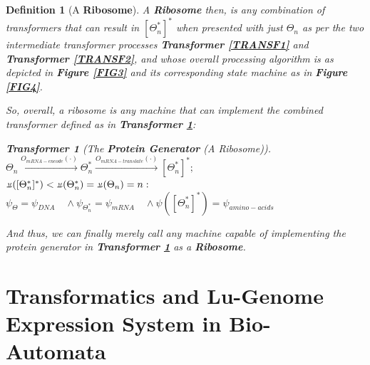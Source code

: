 \documentclass[a4paper, 18pt]{book} %
\newtheorem{defn}{Definition}
\newtheorem{transf}{Transformer}
\newcommand{\invpi}{\rotatebox[origin=c]{180}{$\pi$}}
\begin{document}
\begin{defn}[A \textbf{Ribosome}]
A \textbf{Ribosome} then, is any combination of transformers that can result in $[\Theta^*_n]^*$ when presented with just $\Theta_n$ as per the two intermediate transformer processes \textbf{Transformer \ref{TRANSF1}} and \textbf{Transformer \ref{TRANSF2}}, and whose overall processing algorithm is as depicted in \textbf{Figure \ref{FIG3}} and its corresponding state machine as in \textbf{Figure \ref{FIG4}}. 

So, overall, a ribosome is any machine that can implement the combined transformer defined as in \textbf{Transformer \ref{TRANSF3}}:

\begin{transf}[The \textbf{Protein Generator} (A Ribosome)]
\label{TRANSF3}
$\Theta_n  \xrightarrow{O_{mRNA-encode}(\cdot)}  \Theta^*_n  \xrightarrow{O_{mRNA-translate}(\cdot)} [\Theta^*_n]^*;$\\
$\invpi([\Theta^*_n]^*) < \invpi(\Theta^*_n) = \invpi(\Theta_n) = n:$\\
$\psi_{\Theta} = \psi_{DNA} \quad \land \psi_{\Theta^*_n} = \psi_{mRNA} \quad \land \psi([\Theta^*_n]^*) = \psi_{amino-acids}$
\end{transf}

And thus, we can finally merely call any machine capable of implementing the protein generator  in \textbf{Transformer \ref{TRANSF3}} as a \textbf{Ribosome}.

\end{defn}


\chapter{Transformatics and Lu-Genome Expression System in Bio-Automata}
\label{SEC4}
\end{document}
